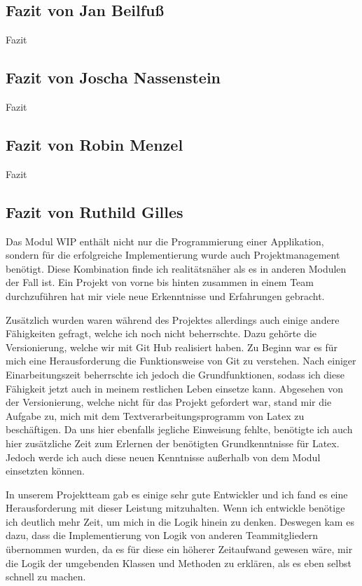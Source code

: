 \subsection{Fazit von Jan Beilfuß}

Fazit

\subsection{Fazit von Joscha Nassenstein}

Fazit

\subsection{Fazit von Robin Menzel}

Fazit

\subsection{Fazit von Ruthild Gilles}

Das Modul WIP enthält nicht nur die Programmierung einer Applikation, sondern für die erfolgreiche Implementierung wurde auch Projektmanagement benötigt. Diese Kombination finde ich realitätsnäher als es in anderen Modulen der Fall ist. Ein Projekt von vorne bis hinten zusammen in einem Team durchzuführen hat mir viele neue Erkenntnisse und Erfahrungen gebracht.

Zusätzlich wurden waren während des Projektes allerdings auch einige andere Fähigkeiten gefragt, welche ich noch nicht beherrschte. Dazu gehörte die Versionierung, welche wir mit Git Hub realisiert haben. Zu Beginn war es für mich eine Herausforderung die Funktionsweise von Git zu verstehen. Nach einiger Einarbeitungszeit beherrschte ich jedoch die Grundfunktionen, sodass ich diese Fähigkeit jetzt auch in meinem restlichen Leben einsetze kann. Abgesehen von der Versionierung, welche nicht für das Projekt gefordert war, stand mir die Aufgabe zu, mich mit dem Textverarbeitungsprogramm von Latex zu beschäftigen. Da uns hier ebenfalls jegliche Einweisung fehlte, benötigte ich auch hier zusätzliche Zeit zum Erlernen der benötigten Grundkenntnisse für Latex. Jedoch werde ich auch diese neuen Kenntnisse außerhalb von dem Modul einsetzten können.

In unserem Projektteam gab es einige sehr gute Entwickler und ich fand es eine Herausforderung mit dieser Leistung mitzuhalten. Wenn ich entwickle benötige ich deutlich mehr Zeit, um mich in die Logik hinein zu denken. Deswegen kam es dazu, dass die Implementierung von Logik von anderen Teammitgliedern übernommen wurden, da es für diese ein höherer Zeitaufwand gewesen wäre, mir die Logik der umgebenden Klassen und Methoden zu erklären, als es eben selbst schnell zu machen.

